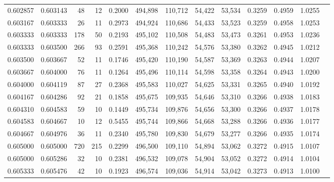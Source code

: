 \begin{tabular}{rrrrrrrrrrrrr}
0.602857 & 0.603143 &    48 &  12 &                                     0.2000 & 494,898 & 110,712 &  54,422 &  53,534 & 0.3259 & 0.4959 & 1.0255 \\
0.603167 & 0.603333 &    26 &  11 &                                     0.2973 & 494,924 & 110,686 &  54,433 &  53,523 & 0.3259 & 0.4958 & 1.0253 \\
0.603333 & 0.603333 &   178 &  50 &                                     0.2193 & 495,102 & 110,508 &  54,483 &  53,473 & 0.3261 & 0.4953 & 1.0236 \\
0.603333 & 0.603500 &   266 &  93 &                                     0.2591 & 495,368 & 110,242 &  54,576 &  53,380 & 0.3262 & 0.4945 & 1.0212 \\
0.603500 & 0.603667 &    52 &  11 &                                     0.1746 & 495,420 & 110,190 &  54,587 &  53,369 & 0.3263 & 0.4944 & 1.0207 \\
0.603667 & 0.604000 &    76 &  11 &                                     0.1264 & 495,496 & 110,114 &  54,598 &  53,358 & 0.3264 & 0.4943 & 1.0200 \\
0.604000 & 0.604119 &    87 &  27 &                                     0.2368 & 495,583 & 110,027 &  54,625 &  53,331 & 0.3265 & 0.4940 & 1.0192 \\
0.604167 & 0.604286 &    92 &  21 &                                     0.1858 & 495,675 & 109,935 &  54,646 &  53,310 & 0.3266 & 0.4938 & 1.0183 \\
0.604310 & 0.604583 &    59 &  10 &                                     0.1449 & 495,734 & 109,876 &  54,656 &  53,300 & 0.3266 & 0.4937 & 1.0178 \\
0.604583 & 0.604667 &    10 &  12 &                                     0.5455 & 495,744 & 109,866 &  54,668 &  53,288 & 0.3266 & 0.4936 & 1.0177 \\
0.604667 & 0.604976 &    36 &  11 &                                     0.2340 & 495,780 & 109,830 &  54,679 &  53,277 & 0.3266 & 0.4935 & 1.0174 \\
0.605000 & 0.605000 &   720 & 215 &                                     0.2299 & 496,500 & 109,110 &  54,894 &  53,062 & 0.3272 & 0.4915 & 1.0107 \\
0.605000 & 0.605286 &    32 &  10 &                                     0.2381 & 496,532 & 109,078 &  54,904 &  53,052 & 0.3272 & 0.4914 & 1.0104 \\
0.605333 & 0.605476 &    42 &  10 &                                     0.1923 & 496,574 & 109,036 &  54,914 &  53,042 & 0.3273 & 0.4913 & 1.0100 \\

\end{tabular}

